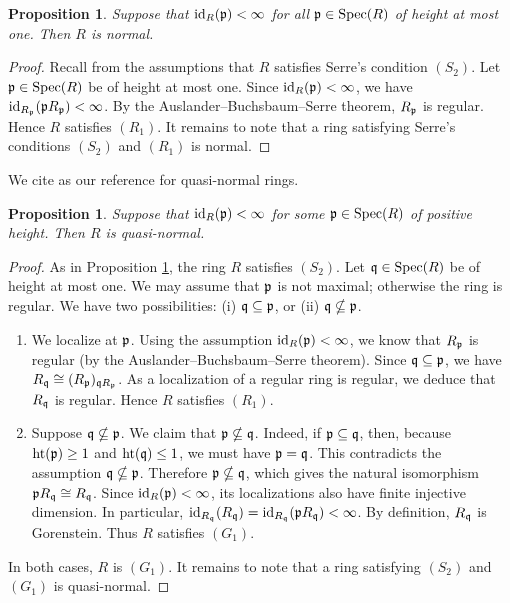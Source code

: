 \documentclass[10. pt,a4paper]{amsart}
\newtheorem{proposition}[theorem]{Proposition}
\theoremstyle{definition}
\theoremstyle{remark}
\newcommand{\Spec}{\operatorname{Spec}}
\newcommand{\id}{\operatorname{id}}
\newcommand{\fp}{\frak{p}}
\newcommand{\fq}{\frak{q}}
\begin{document}
\begin{proposition}\label{nor}
	Suppose that $\id_R(\fp)<\infty$ for all $\fp\in\Spec(R)$ of height at most one. Then $R$ is normal.
\end{proposition}

\begin{proof}
	Recall from the assumptions that $R$ satisfies Serre's condition $(S_2)$. Let $\fp\in\Spec(R)$ be of height at most one. Since $\id_R(\fp)<\infty$, we have $\id_{R_{\fp}}(\fp R_{\fp})<\infty$. By the Auslander--Buchsbaum--Serre theorem, $R_{\fp}$ is regular. Hence $R$ satisfies $(R_1)$. It remains to note that a ring satisfying Serre's conditions $(S_2)$ and $(R_1)$ is normal.
\end{proof}

We cite \cite{wol} as our reference for quasi-normal rings.


\begin{proposition}\label{qn}
	Suppose that $\id_R(\fp)<\infty$ for some $\fp\in\Spec(R)$ of positive height. Then $R$ is quasi-normal.
\end{proposition}

\begin{proof}
	As in Proposition \ref{nor}, the ring $R$ satisfies $(S_2)$.
	Let $\fq\in\Spec(R)$ be of height at most one. We may assume that $\fp$ is not maximal; otherwise the ring is regular. We have two possibilities:
	(i) $\fq\subseteq \fp$, or (ii) $\fq\nsubseteq \fp$.
	
	\begin{enumerate}
		\item[(i)] We localize at $\fp$. Using the assumption $\id_R(\fp)<\infty$, we know that $R_{\fp}$ is regular (by the Auslander--Buchsbaum--Serre theorem). Since $\fq\subseteq \fp$, we have $R_{\fq}\cong (R_{\fp})_{\fq R_{\fp}}$. As a localization of a regular ring is regular, we deduce that $R_{\fq}$ is regular. Hence $R$ satisfies $(R_1)$.
		
		\item[(ii)] Suppose $\fq\nsubseteq\fp$. We claim that $\fp\nsubseteq\fq$. Indeed, if $\fp\subseteq \fq$, then, because $\operatorname{ht}(\fp)\geq 1$ and $\operatorname{ht}(\fq)\leq 1$, we must have $\fp=\fq$. This contradicts the assumption $\fq\nsubseteq\fp$. Therefore $\fp\nsubseteq\fq$, which gives the natural isomorphism $\fp R_{\fq}\cong R_{\fq}$. Since $\id_R(\fp)<\infty$, its localizations also have finite injective dimension. In particular, $\id_{R_{\fq}}(R_{\fq})=\id_{R_{\fq}}(\fp R_{\fq})<\infty$. By definition, $R_{\fq}$ is Gorenstein. Thus $R$ satisfies $(G_1)$.
	\end{enumerate}
	
	In both cases, $R$ is $(G_1)$. It remains to note that a ring satisfying $(S_2)$ and $(G_1)$ is quasi-normal.
\end{proof}
\end{document}
